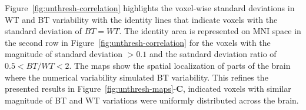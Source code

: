 \begin{figure}[ht]
  \end{figure}


Figure~\ref{fig:unthresh-correlation} highlights the voxel-wise standard deviations in WT and BT variability
with the identity lines that indicate voxels with the standard deviation of $BT = WT$.
The identity area is represented on MNI space in the second row in Figure~\ref{fig:unthresh-correlation}
for the voxels with the magnitude of standard deviation $> 0.1$ and the satndard deviation ratio of $0.5 < BT/WT < 2$.
The maps show the spatial localization of parts of the brain where the numerical variability simulated BT variability.
This refines the presented results in Figure~\ref{fig:unthresh-maps}-\textbf{C},
indicated voxels with similar magnitude of BT and WT variations were uniformly distributed across the brain.

